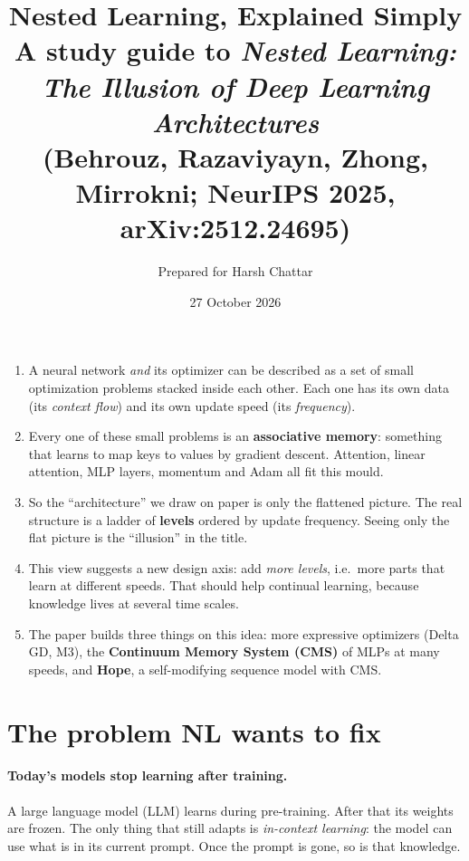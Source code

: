 \documentclass[11pt,a4paper]{article}
\title{\textbf{Nested Learning, Explained Simply}\\[0.3em]
\large A study guide to \emph{Nested Learning: The Illusion of Deep Learning Architectures}\\
(Behrouz, Razaviyayn, Zhong, Mirrokni; NeurIPS 2025, arXiv:2512.24695)}
\author{Prepared for Harsh Chattar}
\date{27 October 2026}
\begin{document}
\maketitle

\begin{keyidea}
\begin{enumerate}[leftmargin=1.4em]
  \item A neural network \emph{and} its optimizer can be described as a set of small optimization problems stacked inside each other. Each one has its own data (its \emph{context flow}) and its own update speed (its \emph{frequency}).
  \item Every one of these small problems is an \textbf{associative memory}: something that learns to map keys to values by gradient descent. Attention, linear attention, MLP layers, momentum and Adam all fit this mould.
  \item So the ``architecture'' we draw on paper is only the flattened picture. The real structure is a ladder of \textbf{levels} ordered by update frequency. Seeing only the flat picture is the ``illusion'' in the title.
  \item This view suggests a new design axis: add \emph{more levels}, i.e.\ more parts that learn at different speeds. That should help continual learning, because knowledge lives at several time scales.
  \item The paper builds three things on this idea: more expressive optimizers (Delta GD, M3), the \textbf{Continuum Memory System (CMS)} of MLPs at many speeds, and \textbf{Hope}, a self-modifying sequence model with CMS.
\end{enumerate}
\end{keyidea}

\setcounter{tocdepth}{1}
\tableofcontents
\newpage

\section{The problem NL wants to fix}

\paragraph{Today's models stop learning after training.}
A large language model (LLM) learns during pre-training. After that its weights are frozen. The only thing that still adapts is \emph{in-context learning}: the model can use what is in its current prompt. Once the prompt is gone, so is that knowledge.
\end{document}
